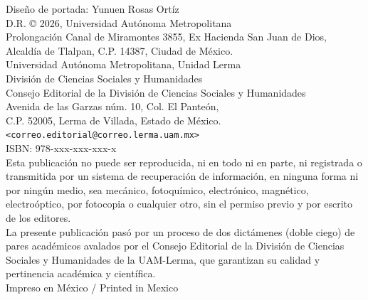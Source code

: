 Diseño de portada: Yunuen Rosas Ortíz\\

D.R. © 2026, Universidad Autónoma Metropolitana\\
Prolongación Canal de Miramontes 3855, Ex Hacienda San Juan de Dios,\\
Alcaldía de Tlalpan, C.P. 14387, Ciudad de México.\\[0.5em]
{\scriptsize Universidad Autónoma Metropolitana, Unidad Lerma}\\
División de Ciencias Sociales y Humanidades\\
Consejo Editorial de la División de Ciencias Sociales y Humanidades\\
Avenida de las Garzas núm. 10, Col. El Panteón,\\
C.P. 52005, Lerma de Villada, Estado de México.\\
\texttt{<correo.editorial@correo.lerma.uam.mx>}\\[0.8em]
ISBN: 978-xxx-xxx-xxx-x\\[0.8em]
Esta publicación no puede ser reproducida, ni en todo ni en parte, ni registrada o transmitida por un sistema de recuperación de información, en ninguna forma ni por ningún medio, sea mecánico, fotoquímico, electrónico, magnético, electroóptico, por fotocopia o cualquier otro, sin el permiso previo y por escrito de los editores.\\[0.5em]
La presente publicación pasó por un proceso de dos dictámenes (doble ciego) de pares académicos avalados por el Consejo Editorial de la División de Ciencias Sociales y Humanidades de la UAM-Lerma, que garantizan su calidad y pertinencia académica y científica.\\[0.5em]
Impreso en México / Printed in Mexico
\clearpage

\clearpage          %

\normalsize
\normalfont         %


\pagestyle{plain}   %
\setcounter{page}{1}